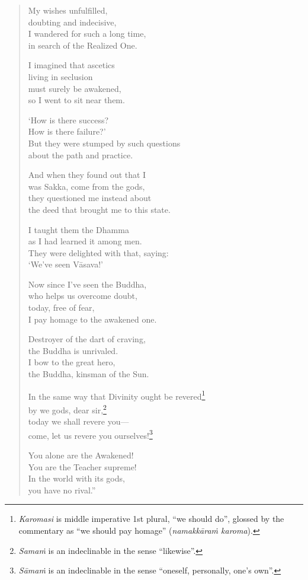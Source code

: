 \documentclass[12pt,openany]{book}%
\begin{document}
\begin{verse}%
My wishes unfulfilled, \\
doubting and indecisive, \\
I wandered for such a long time, \\
in search of the Realized One. 

I imagined that ascetics \\
living in seclusion \\
must surely be awakened, \\
so I went to sit near them. 

‘How is there success? \\
How is there failure?’ \\
But they were stumped by such questions \\
about the path and practice. 

And when they found out that I \\
was Sakka, come from the gods, \\
they questioned me instead about \\
the deed that brought me to this state. 

I taught them the Dhamma \\
as I had learned it among men. \\
They were delighted with that, saying: \\
‘We’ve seen \textsanskrit{Vāsava}!’ 

Now since I’ve seen the Buddha, \\
who helps us overcome doubt, \\
today, free of fear, \\
I pay homage to the awakened one. 

Destroyer of the dart of craving, \\
the Buddha is unrivaled. \\
I bow to the great hero, \\
the Buddha, kinsman of the Sun. 

In the same way that Divinity ought be revered\footnote{\textit{Karomasi} is middle imperative 1st plural, “we should do”, glossed by the commentary as “we should pay homage” (\textit{\textsanskrit{namakkāraṁ} karoma}). } \\
by we gods, dear sir,\footnote{\textit{\textsanskrit{Samaṁ}} is an indeclinable in the sense “likewise”. } \\
today we shall revere you—\\
come, let us revere you ourselves!\footnote{\textit{\textsanskrit{Sāmaṁ}} is an indeclinable in the sense “oneself, personally, one’s own”. } 

You alone are the Awakened! \\
You are the Teacher supreme! \\
In the world with its gods, \\
you have no rival.” 

%
\end{verse}
\end{document}
